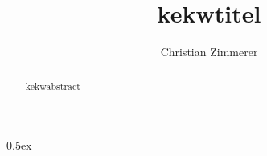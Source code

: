 \documentclass[11pt,a4paper]{article}
\begin{document}
\title{%
  kekwtitel
}

\author{%
  Christian Zimmerer
}

\maketitle

\begin{abstract}
kekwabstract

\end{abstract}

\newpage

\tableofcontents

\newpage

\parindent 0pt\parskip 0.5ex



\nocite{hoelzl09}




\end{document}
